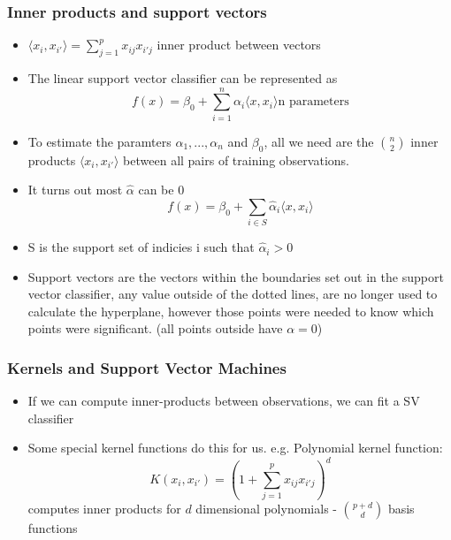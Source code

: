 \documentclass{article}
\begin{document}
\subsubsection{Inner products and support vectors}
\begin{itemize}
    \item $\langle x_i, x_{i'} \rangle = \sum_{j=1}^p x_{ij} x_{i'j}$ inner product between vectors
    \item The linear support vector classifier can be represented as 
    \begin{equation*}
        f(x) = \beta_0 + \sum_{i=1}^n \alpha_i \langle x, x_i \rangle \text{n parameters}
    \end{equation*}
    \item To estimate the paramters $\alpha_1, ..., \alpha_n$ and $\beta_0$, all we need are the $\binom{n}{2}$ inner products $\langle x_i, x_{i'} \rangle$ between all pairs of training observations.
    \item It turns out most $\hat{\alpha}$ can be 0
    \begin{equation*}
        f(x) = \beta_0 + \sum_{i\in S} \hat{\alpha}_i \langle x, x_i \rangle
    \end{equation*}
    \item S is the support set of indicies i such that $\hat{\alpha}_i > 0$
    \item Support vectors are the vectors within the boundaries set out in the support vector classifier, any value outside of the dotted lines, are no longer used to calculate the hyperplane, however those points were needed to know which points were significant. (all points outside have $\alpha = 0$)
\end{itemize}

\subsubsection{Kernels and Support Vector Machines}

\begin{itemize}
    \item If we can compute inner-products between observations, we can fit a SV classifier
    \item Some special kernel functions do this for us. e.g.
    \subitem Polynomial kernel function:
    \begin{equation*}
        K(x_i, x_{i'}) = (1 + \sum_{j=1}^p x_{ij}x_{i' j})^d
    \end{equation*}
    computes inner products for $d$ dimensional polynomials - $\binom{p + d}{d}$ basis functions
\end{itemize}
\end{document}
